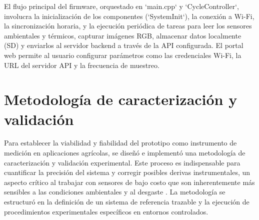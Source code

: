El flujo principal del firmware, orquestado en `main.cpp` y `CycleController`, involucra la inicialización de los componentes (`SystemInit`), la conexión a Wi-Fi, la sincronización horaria, y la ejecución periódica de tareas para leer los sensores ambientales y térmicos, capturar imágenes RGB, almacenar datos localmente (SD) y enviarlos al servidor backend a través de la API configurada. El portal web permite al usuario configurar parámetros como las credenciales Wi-Fi, la URL del servidor API y la frecuencia de muestreo.

\section{Metodología de caracterización y validación}
\label{sec:hardware_metodologia}
Para establecer la viabilidad y fiabilidad del prototipo como instrumento de medición en aplicaciones agrícolas, se diseñó e implementó una metodología de caracterización y validación experimental. Este proceso es indispensable para cuantificar la precisión del sistema y corregir posibles derivas instrumentales, un aspecto crítico al trabajar con sensores de bajo costo que son inherentemente más sensibles a las condiciones ambientales y al desgaste . La metodología se estructuró en la definición de un sistema de referencia trazable y la ejecución de procedimientos experimentales específicos en entornos controlados.

